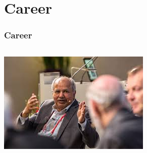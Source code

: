 \documentclass{beamer}
\begin{document}
 
 \section{Career}
\begin{frame}%
 \transblindsvertical
 \frametitle{Career}
 \begin{columns}
  \begin{column}{0.19\textwidth}
    
   
\end{column}

  \begin{column}{0.7\textwidth}
  \end{column}
 \end{columns}
 
 \begin{center}
  \includegraphics[scale=0.5]{rajibm.jpeg}
 \end{center}
 
\end{frame}
\end{document}
